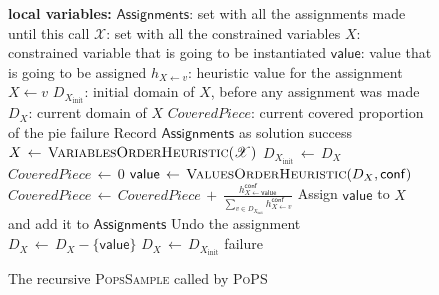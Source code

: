 \documentclass{ws-ijait}
\begin{document}
\begin{figure}
  \centering
  \begin{algorithmic}
      \State \textbf{local variables:}
      \State \quad $\mathsf{Assignments}$: set with all the
             assignments made until this call
      \State \quad $\mathscr{X}$: set with all the
             constrained variables
      \State \quad $X$: constrained variable that is going
             to be instantiated
      \State \quad $\mathsf{value}$: value that is going to
             be assigned
      \State \quad $h_{X \gets v}$: heuristic value for the
             assignment $X \gets v$
      \State \quad $D_{X_\mathrm{init}}$: initial domain of
             $X$, before any assignment was made
      \State \quad $D_X$: current domain of $X$
      \State \quad $\mathit{CoveredPiece}$: current covered
             proportion of the pie
      \State
        \State \Return failure
        \State Record $\mathsf{Assignments}$ as solution
        \State \Return success
      \EndIf
      \State $X \, \gets \,
              \Call{VariablesOrderHeuristic}{\mathscr{X}}$
      \State $D_{X_\mathrm{init}} \, \gets \, D_X$
      \State $\mathit{CoveredPiece} \, \gets \, 0$
        \State $\mathsf{value} \, \gets \,
                \Call{ValuesOrderHeuristic}{D_X, \mathsf{conf}}$
        \State $\mathit{CoveredPiece} \, \gets \,
                \mathit{CoveredPiece} \, + \,
                \frac{h_{X \gets \mathsf{value}}^\mathsf{conf}}
                     {\sum_{v \in D_{X_\mathrm{init}}}
                      h_{X \gets v}^\mathsf{conf}}$
        \State Assign $\mathsf{value}$ to $X$ and add it to
               $\mathsf{Assignments}$
        \State {}
        \State Undo the assignment
        \State $D_X \, \gets \, D_X - \{\mathsf{value}\}$
      \EndWhile
      \State $D_X \, \gets \, D_{X_\mathrm{init}}$
      \State \Return failure
    \EndFunction
  \end{algorithmic}
  \caption{The recursive {\normalfont\textsc{PopsSample}}
           called by
           {\normalfont\textsc{PoPS}}\label{PopsSample}}
\end{figure}
\end{document}
